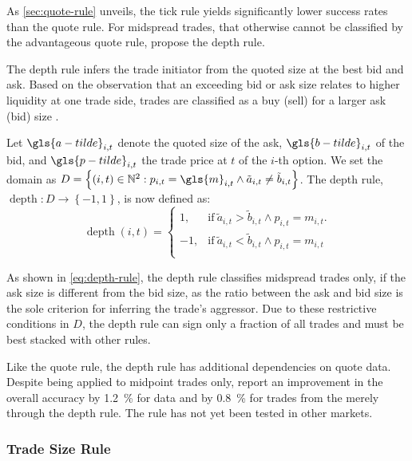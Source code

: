 As \cref{sec:quote-rule} unveils, the tick rule yields significantly lower success rates than the quote rule. For midspread trades, that otherwise cannot be classified by the advantageous quote rule, \textcite[][14]{grauerOptionTradeClassification2022} propose the depth rule.

The depth rule infers the trade initiator from the quoted size at the best bid and ask. Based on the observation that an exceeding bid or ask size relates to higher liquidity at one trade side, trades are classified as a buy (sell) for a larger ask (bid) size \autocite[][14]{grauerOptionTradeClassification2022}.

Let $\gls{a-tilde}_{i,t}$ denote the quoted size of the ask, $\gls{b-tilde}_{i,t}$ of the bid, and $\gls{p-tilde}_{i,t}$ the trade price at $t$ of the $i$-th option. We set the domain as $D = \left\{(i, t) \in \mathbb{N}^2: p_{i,t} = \gls{m}_{i,t} \land \tilde{a}_{i,t} \neq \tilde{b}_{i,t} \right\}$. The depth rule, $\operatorname{depth} \colon D \to \left\{-1, 1\right\}$, is now defined as:
\begin{equation}
\operatorname{depth}(i, t)=
\begin{cases}
1, & \text{if}\ \tilde{a}_{i,t} > \tilde{b}_{i,t} \land p_{i, t} = m_{i, t}. \\
-1,  & \text{if}\ \tilde{a}_{i,t} < \tilde{b}_{i,t} \land p_{i, t} = m_{i, t} \\
\end{cases}
\label{eq:depth-rule}
\end{equation}

As shown in \cref{eq:depth-rule}, the depth rule classifies midspread trades only, if the ask size is different from the bid size, as the ratio between the ask and bid size is the sole criterion for inferring the trade's aggressor. Due to these restrictive conditions in $D$, the depth rule can sign only a fraction of all trades and must be best stacked with other rules.

Like the quote rule, the depth rule has additional dependencies on quote data. Despite being applied to midpoint trades only, \textcite[][4]{grauerOptionTradeClassification2022} report an improvement in the overall accuracy by \SI{1.2}{\percent} for  data and by \SI{0.8}{\percent} for trades from the  merely through the depth rule. The rule has not yet been tested in other markets.

\subsubsection{Trade Size Rule}\label{sec:trade-size-rule}

